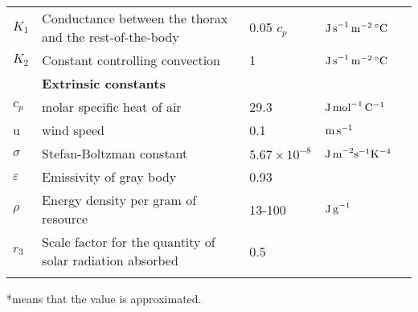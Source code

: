 \begin{sidewaystable}
\begin{tabular}{l l l l l}
$K_1$& Conductance between the thorax and the rest-of-the-body & 0.05 $c_p$ & $\rm{J \,s}^{-1} \, \rm{m}^{-2} \, ^{\circ}\rm{C}$  & \citet{Campbell2012} \\
$K_2$& Constant controlling convection & 1   & $\rm{J \,s}^{-1} \, \rm{m}^{-2} \, ^{\circ}\rm{C}$  & \citet{Campbell2012} \\
\hline
& \textbf{Extrinsic constants} & & &  \\
$c_p$ & molar specific heat of air  & 29.3 &  $\rm{J \, mol}^ {-1} \, \rm{C}^ {-1}$ & \citet{Campbell2012} \\
u &  wind speed & 0.1 & $\rm{m \, s}^{-1}$ & \\
$\sigma$ & Stefan-Boltzman constant & $5.67 \times 10^{-8}$ &  $\rm{J \, m}^{-2} \rm{s}^{-1} \rm{K}^{-4}  $  &  \\
$\varepsilon$& Emissivity of gray body & 0.93& & \citep{Campbell2012} \\
$\rho$ &Energy density per gram of resource & 13-100 &  $\rm{J \, g}^{-1}$  &  \\  %
$r_3$  & Scale factor for the quantity of solar radiation absorbed & 0.5 &  &  \\
\hline
\label{table:table1}
\end{tabular}
\raggedright{*means that the value is approximated.}
\end{sidewaystable}
